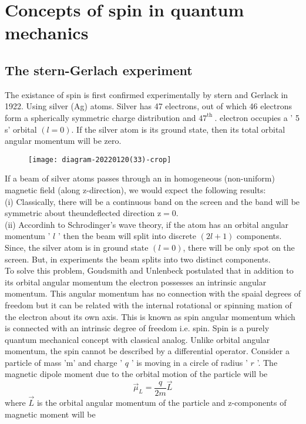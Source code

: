\section{Concepts of spin in quantum mechanics}
\subsection{ The stern-Gerlach experiment}
The existance of spin is first confirmed experimentally by stern and Gerlack in 1922. Using silver (Ag) atoms. Silver has 47 electrons, out of which 46 electrons form a spherically symmetric charge distribution and $47^{\text {th }}$. electron occupies a ' 5 s' orbital $(l=0)$. If the silver atom is its ground state, then its total orbital angular momentum will be zero.\\
\begin{figure}[H]
	\centering
	\texttt{[image: diagram-20220120(33)-crop]}
	\caption{}
	\label{}
\end{figure}
If a beam of silver atoms passes through an in homogeneous (non-uniform) magnetic field (along z-direction), we would expect the following results:\\
(i) Classically, there will be a continuous band on the screen and the band will be symmetric about theundeflected direction $\mathrm{z}=0$.\\
(ii) Accordinh to Schrodinger's wave theory, if the atom has an orbital angular momentum ' $l$ ' then the beam will split into discrete $(2 l+1)$ components. Since, the silver atom is in ground state $(l=0)$, there will be only spot on the screen.
But, in experiments the beam splits into two distinct components.\\
To solve this problem, Goudsmith and Unlenbeck postulated that in addition to its orbital angular momentum the electron possesses an intrinsic angular momentum. This angular momentum has no connection with the spaial degrees of freedom but it can be related with the internal rotational or spinning mation of the electron about its own axis. This is known as spin angular momentum which is connected with an intrinsic degree of freedom i.e. spin. Spin is a purely quantum mechanical concept with classical analog. Unlike orbital angular momentum, the spin cannot be described by a differential operator.
Consider a particle of mass 'm' and charge ' $q$ ' is moving in a circle of radius ' $r$ '. The magnetic dipole moment due to the orbital motion of the particle will be
$$
\vec{\mu}_{L}=\frac{q}{2 m} \vec{L}
$$
where $\vec{L}$ is the orbital angular momentum of the particle and z-components of magnetic moment will be
